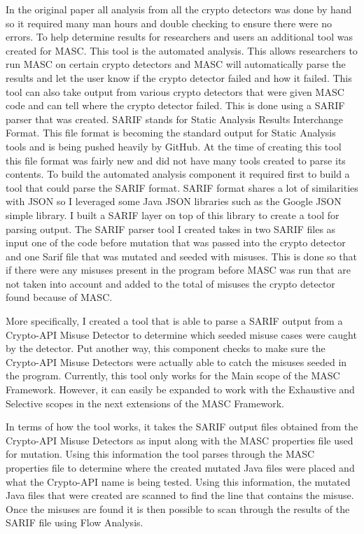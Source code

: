 In the original paper all analysis from all the crypto detectors was done by hand so it required many man hours and double checking to ensure there were no errors. To help determine results for researchers and users an additional tool was created for MASC. This tool is the automated analysis. This allows researchers to run MASC on certain crypto detectors and MASC will automatically parse the results and let the user know if the crypto detector failed and how it failed. This tool can also take output from various crypto detectors that were given MASC code and can tell where the crypto detector failed. This is done using a SARIF parser that was created. SARIF stands for Static Analysis Results Interchange Format. This file format is becoming the standard output for Static Analysis tools and is being pushed heavily by GitHub. At the time of creating this tool this file format was fairly new and did not have many tools created to parse its contents. To build the automated analysis component it required first to build a tool that could parse the SARIF format. SARIF format shares a lot of similarities with JSON so I leveraged some Java JSON libraries such as the Google JSON simple library. I built a SARIF layer on top of this library to create a tool for parsing output. The SARIF parser tool I created takes in two SARIF files as input one of the code before mutation that was passed into the crypto detector and one Sarif file that was mutated and seeded with misuses. This is done so that if there were any misuses present in the program before MASC was run that are not taken into account and added to the total of misuses the crypto detector found because of MASC. 

More specifically, I created a tool that is able to parse a SARIF output from a Crypto-API Misuse Detector to determine which seeded misuse cases were caught by the detector.  Put another way, this component checks to make sure the Crypto-API Misuse Detectors were actually able to catch the misuses seeded in the program. Currently, this tool only works for the Main scope of the MASC Framework.  However, it can easily be expanded to work with the Exhaustive and Selective scopes in the next extensions of the MASC Framework. 
    
In terms of how the tool works, it takes the SARIF output files obtained from the Crypto-API Misuse Detectors as input along with the MASC properties file used for mutation. Using this information the tool parses through the MASC properties file to determine where the created mutated Java files were placed and what the Crypto-API name is being tested.  Using this information, the mutated Java files that were created are scanned to find the line that contains the misuse.  Once the misuses are found it is then possible to scan through the results of the SARIF file using Flow Analysis.

